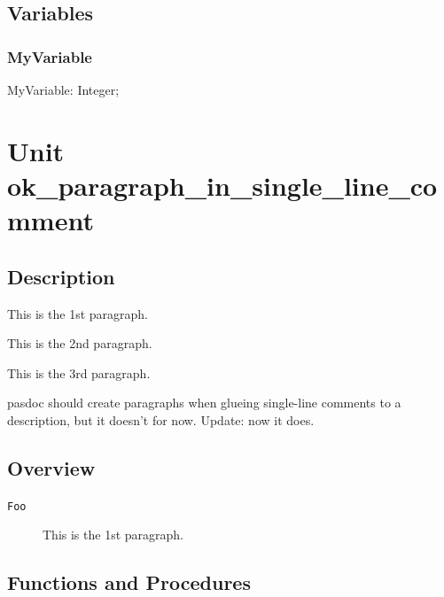 \documentclass{report}
\begin{document}
\section{Variables}
\subsection*{MyVariable}
\begin{list}{}{
\setlength{\itemindent}{0cm}
\setlength{\listparindent}{0cm}
\setlength{\leftmargin}{\evensidemargin}
\addtolength{\leftmargin}{\tmplength}
\settowidth{\labelsep}{X}
\addtolength{\leftmargin}{\labelsep}
\setlength{\labelwidth}{\tmplength}
}
\begin{flushleft}
\item[\textbf{Declaration}\hfill]
\begin{ttfamily}
MyVariable: Integer;\end{ttfamily}


\end{flushleft}
\end{list}
\chapter{Unit ok{\_}paragraph{\_}in{\_}single{\_}line{\_}comment}
\section{Description}
This is the 1st paragraph.

This is the 2nd paragraph.

This is the 3rd paragraph.

pasdoc should create paragraphs when glueing single{-}line comments to a description, but it doesn't for now. Update: now it does.
\section{Overview}
\begin{description}
\item[\texttt{Foo}]This is the 1st paragraph.
\end{description}
\section{Functions and Procedures}
\end{document}
